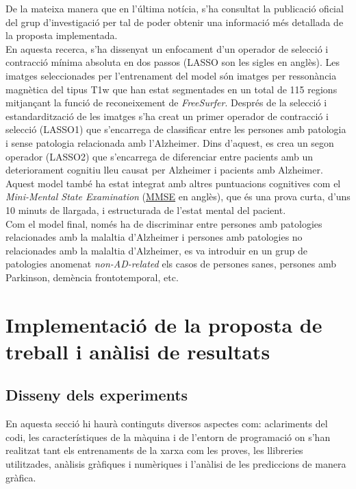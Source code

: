\documentclass[a4paper,12pt]{report}
\begin{document}
De la mateixa manera que en l'última notícia, s'ha consultat la publicació oficial del grup d'investigació per tal de poder obtenir una informació més detallada de la proposta implementada.\\
En aquesta recerca, s'ha dissenyat un enfocament d'un operador de selecció i contracció mínima absoluta en dos passos (LASSO son les sigles en anglès). Les imatges seleccionades per l'entrenament del model són imatges per ressonància magnètica del tipus T1w que han estat segmentades en un total de 115 regions mitjançant la funció de reconeixement de \textit{FreeSurfer}. Després de la selecció i estandardització de les imatges s'ha creat un primer operador de contracció i selecció (LASSO1) que s'encarrega de classificar entre les persones amb patologia i sense patologia relacionada amb l'Alzheimer. Dins d'aquest, es crea un segon operador (LASSO2) que s'encarrega de diferenciar entre pacients amb un deteriorament cognitiu lleu causat per Alzheimer i pacients amb Alzheimer. Aquest model també ha estat integrat amb altres puntuacions cognitives com el \textit{Mini-Mental State Examination} (\href{https://www.farmaceuticoscomunitarios.org/anexos/vol11_n1/ANEXO2.pdf}{\underline{MMSE}} en anglès), que és una prova curta, d'uns 10 minuts de llargada, i estructurada de l'estat mental del pacient.\\
Com el model final, només ha de discriminar entre persones amb patologies relacionades amb la malaltia d'Alzheimer i persones amb patologies no relacionades amb la malaltia d'Alzheimer, es va introduir en un grup de patologies anomenat \textit{non-AD-related} els casos de persones sanes, persones amb Parkinson, demència frontotemporal, etc.
\chapter*{Implementació de la proposta de treball i anàlisi de resultats}
\section*{Disseny dels experiments}
 En aquesta secció hi haurà continguts diversos aspectes com: aclariments del codi, les característiques de la màquina i de l'entorn de programació on s'han realitzat tant els entrenaments de la xarxa com les proves, les llibreries utilitzades, anàlisis gràfiques i numèriques i l'anàlisi de les prediccions de manera gràfica.
\end{document}
